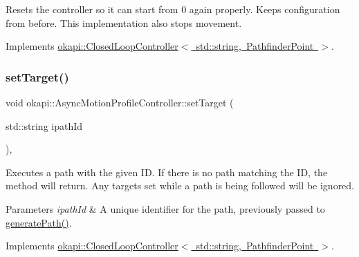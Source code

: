 Resets the controller so it can start from 0 again properly. Keeps configuration from before. This implementation also stops movement. 

Implements \mbox{\hyperlink{classokapi_1_1ClosedLoopController_a7dd6ce28b3e38bdf987514a1b6c83c8c}{okapi\+::\+Closed\+Loop\+Controller$<$ std\+::string, Pathfinder\+Point $>$}}.

\mbox{\label{classokapi_1_1AsyncMotionProfileController_adf705d6bfd3d0a83d8a6c50a05ffd156}} 
\subsubsection{\texorpdfstring{setTarget()}{setTarget()}\hspace{0.1cm}{\footnotesize\ttfamily [1/2]}}
{\footnotesize\ttfamily void okapi\+::\+Async\+Motion\+Profile\+Controller\+::set\+Target (\begin{DoxyParamCaption}\item[{std\+::string}]{ipath\+Id }\end{DoxyParamCaption})\hspace{0.3cm}{\ttfamily [override]}, {\ttfamily [virtual]}}

Executes a path with the given ID. If there is no path matching the ID, the method will return. Any targets set while a path is being followed will be ignored.


\begin{DoxyParams}{Parameters}
{\em ipath\+Id} & A unique identifier for the path, previously passed to {\ttfamily \mbox{\hyperlink{classokapi_1_1AsyncMotionProfileController_a3b8ba2a691bea6f1cf7596f0ecb8b899}{generate\+Path()}}}. \\
\hline
\end{DoxyParams}


Implements \mbox{\hyperlink{classokapi_1_1ClosedLoopController_ac14482d0768b3f157d52e0214a4c36d7}{okapi\+::\+Closed\+Loop\+Controller$<$ std\+::string, Pathfinder\+Point $>$}}.

\mbox{\label{classokapi_1_1AsyncMotionProfileController_a2846d2e36b86b39aa2e761e4e34cd225}} 
